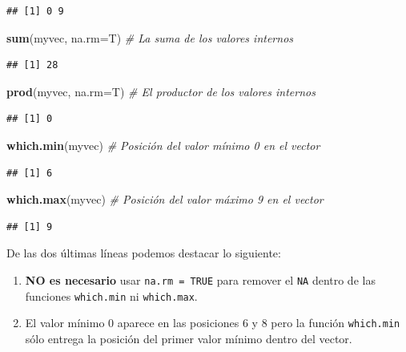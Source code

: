 \documentclass[10pt,]{krantz}
\makeatletter
\newenvironment{Shaded}{\begin{snugshade}}{\end{snugshade}}
\newcommand{\KeywordTok}[1]{\textcolor[rgb]{0.13,0.29,0.53}{\textbf{#1}}}
\newcommand{\DataTypeTok}[1]{\textcolor[rgb]{0.13,0.29,0.53}{#1}}
\newcommand{\CommentTok}[1]{\textcolor[rgb]{0.56,0.35,0.01}{\textit{#1}}}
\newcommand{\NormalTok}[1]{#1}
\providecommand{\tightlist}{%
  \setlength{\itemsep}{0pt}\setlength{\parskip}{0pt}}
\newenvironment{kframe}{%
\medskip{}
\setlength{\fboxsep}{.8em}
 \def\at@end@of@kframe{}%
 \ifinner\ifhmode%
  \def\at@end@of@kframe{\end{minipage}}%
  \begin{minipage}{\columnwidth}%
 \fi\fi%
 \def\FrameCommand##1{\hskip\@totalleftmargin \hskip-\fboxsep
 \colorbox{shadecolor}{##1}\hskip-\fboxsep
     \hskip-\linewidth \hskip-\@totalleftmargin \hskip\columnwidth}%
 \MakeFramed {\advance\hsize-\width
   \@totalleftmargin\z@ \linewidth\hsize
   \@setminipage}}%
 {\par\unskip\endMakeFramed%
 \at@end@of@kframe}
\renewenvironment{Shaded}{\begin{kframe}}{\end{kframe}}
\makeatother
\begin{document}
\begin{verbatim}
## [1] 0 9
\end{verbatim}

\begin{Shaded}
\begin{Highlighting}[]
\KeywordTok{sum}\NormalTok{(myvec, }\DataTypeTok{na.rm=}\NormalTok{T)  }\CommentTok{# La suma de los valores internos}
\end{Highlighting}
\end{Shaded}

\begin{verbatim}
## [1] 28
\end{verbatim}

\begin{Shaded}
\begin{Highlighting}[]
\KeywordTok{prod}\NormalTok{(myvec, }\DataTypeTok{na.rm=}\NormalTok{T)  }\CommentTok{# El productor de los valores internos}
\end{Highlighting}
\end{Shaded}

\begin{verbatim}
## [1] 0
\end{verbatim}

\begin{Shaded}
\begin{Highlighting}[]
\KeywordTok{which.min}\NormalTok{(myvec)  }\CommentTok{# Posición del valor mínimo 0 en el vector}
\end{Highlighting}
\end{Shaded}

\begin{verbatim}
## [1] 6
\end{verbatim}

\begin{Shaded}
\begin{Highlighting}[]
\KeywordTok{which.max}\NormalTok{(myvec)  }\CommentTok{# Posición del valor máximo 9 en el vector}
\end{Highlighting}
\end{Shaded}

\begin{verbatim}
## [1] 9
\end{verbatim}

De las dos últimas líneas podemos destacar lo siguiente:

\begin{enumerate}
\def\labelenumi{\arabic{enumi}.}
\tightlist
\item
  \textbf{NO es necesario} usar \texttt{na.rm\ =\ TRUE} para remover el
  \texttt{NA} dentro de las funciones \texttt{which.min} ni
  \texttt{which.max}.
\item
  El valor mínimo 0 aparece en las posiciones 6 y 8 pero la función
  \texttt{which.min} sólo entrega la posición del primer valor mínimo
  dentro del vector.
\end{enumerate}
\end{document}

